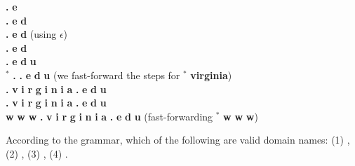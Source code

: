 \begin{exercise}
\begin{subexerciselist}
{\begin{smallquote}
\begin{tabbing}
                     \> \produces \>  {\bf .} {\bf e}    \> \\

                     \> \produces \>  {\bf .} {\bf e} {\bf d}   \> \\
                     \> \produces \>  {\bf .} {\bf e} {\bf d}  \hspace*{2em} (using  \produces $\epsilon$)\\
                     \> \produces \>  {\bf .} {\bf e} {\bf d}  \> \\
                     \> \produces \>  {\bf .} {\bf e} {\bf d} {\bf u} \> \\
                     \> \produces$^*$ \>  {\bf .}  {\bf .} {\bf e} {\bf d} {\bf u} \hspace*{2em} (we fast-forward the steps for  \produces$^*$ {\bf virginia}) \\ 
                     \> \produces \>  {\bf .} {\bf v} {\bf i} {\bf r} {\bf g} {\bf i} {\bf n} {\bf i} {\bf a} {\bf .} {\bf e} {\bf d} {\bf u} \> \\
                     \> \produces \>  {\bf .} {\bf v} {\bf i} {\bf r} {\bf g} {\bf i} {\bf n} {\bf i} {\bf a} {\bf .} {\bf e} {\bf d} {\bf u} \> \\
                     \> \produces \> {\bf w} {\bf w} {\bf w} {\bf .} {\bf v} {\bf i} {\bf r} {\bf g} {\bf i} {\bf n} {\bf i} {\bf a} {\bf .} {\bf e} {\bf d} {\bf u} \hspace{2em} (fast-forwarding  \produces$^*$ {\bf w} {\bf w} {\bf w}) \\
\end{tabbing}
\end{smallquote}
}
\item According to the grammar, which of the following are valid domain names: (1) , (2) , (3) , (4) .
\end{subexerciselist}
\end{exercise}
